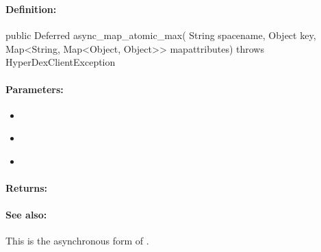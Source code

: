 \pagebreak
\subsubsection{}
\label{api:java:async_map_atomic_max}


\paragraph{Definition:}
\begin{javacode}
public Deferred async_map_atomic_max(
        String spacename,
        Object key,
        Map<String, Map<Object, Object>> mapattributes) throws HyperDexClientException
\end{javacode}

\paragraph{Parameters:}
\begin{itemize}[noitemsep]
\item {}\\

\item {}\\

\item {}\\

\end{itemize}

\paragraph{Returns:}


\paragraph{See also:}  This is the asynchronous form of .

\pagebreak
\subsubsection{}
\label{api:java:cond_map_atomic_max}


